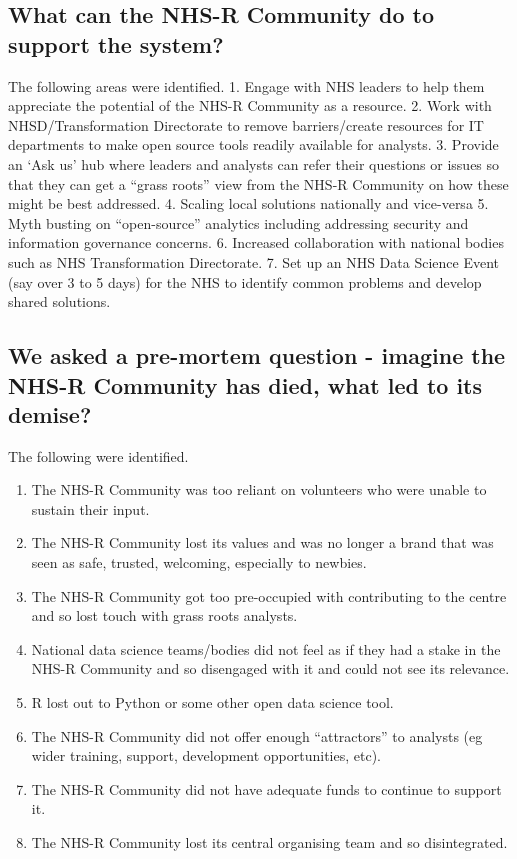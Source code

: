 \documentclass[
]{book}
\providecommand{\tightlist}{%
  \setlength{\itemsep}{0pt}\setlength{\parskip}{0pt}}
\begin{document}
\hypertarget{what-can-the-nhs-r-community-do-to-support-the-system}{%
\subsection{What can the NHS-R Community do to support the system?}\label{what-can-the-nhs-r-community-do-to-support-the-system}}

The following areas were identified.
1. Engage with NHS leaders to help them appreciate the potential of the NHS-R Community as a resource.
2. Work with NHSD/Transformation Directorate to remove barriers/create resources for IT departments to make open source tools readily available for analysts.
3. Provide an `Ask us' hub where leaders and analysts can refer their questions or issues so that they can get a ``grass roots'' view from the NHS-R Community on how these might be best addressed.
4. Scaling local solutions nationally and vice-versa
5. Myth busting on ``open-source'' analytics including addressing security and information governance concerns.
6. Increased collaboration with national bodies such as NHS Transformation Directorate.
7. Set up an NHS Data Science Event (say over 3 to 5 days) for the NHS to identify common problems and develop shared solutions.

\hypertarget{we-asked-a-pre-mortem-question---imagine-the-nhs-r-community-has-died-what-led-to-its-demise}{%
\subsection{We asked a pre-mortem question - imagine the NHS-R Community has died, what led to its demise?}\label{we-asked-a-pre-mortem-question---imagine-the-nhs-r-community-has-died-what-led-to-its-demise}}

The following were identified.

\begin{enumerate}
\def\labelenumi{\arabic{enumi}.}
\tightlist
\item
  The NHS-R Community was too reliant on volunteers who were unable to sustain their input.
\item
  The NHS-R Community lost its values and was no longer a brand that was seen as safe, trusted, welcoming, especially to newbies.
\item
  The NHS-R Community got too pre-occupied with contributing to the centre and so lost touch with grass roots analysts.
\item
  National data science teams/bodies did not feel as if they had a stake in the NHS-R Community and so disengaged with it and could not see its relevance.
\item
  R lost out to Python or some other open data science tool.
\item
  The NHS-R Community did not offer enough ``attractors'' to analysts (eg wider training, support, development opportunities, etc).
\item
  The NHS-R Community did not have adequate funds to continue to support it.
\item
  The NHS-R Community lost its central organising team and so disintegrated.
\end{enumerate}
\end{document}
